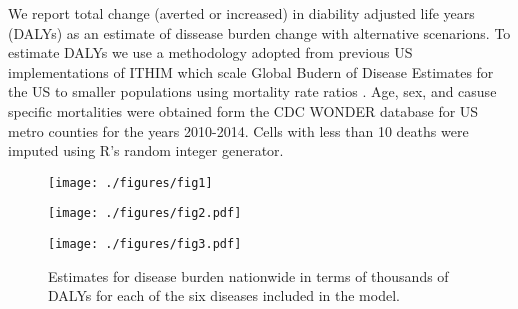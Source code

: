 We report total change (averted or increased) in diability adjusted
life years (DALYs) as an estimate of dissease burden change with
alternative scenarions. To estimate DALYs we use a methodology adopted
from previous US implementations of ITHIM which scale Global Budern of
Disease Estimates for the US to smaller populations using mortality
rate ratios \cite{maizlish2013}. Age, sex, and casuse specific
mortalities were obtained form the CDC WONDER database for US metro
counties for the years 2010-2014. Cells with less than 10 deaths were
imputed using R's random integer generator.

\begin{figure}[t]
  \centerline{\texttt{[image: ./figures/fig1]}}
    \caption{}\label{fig1}
\end{figure}

\begin{figure}[t]
  \centerline{\texttt{[image: ./figures/fig2.pdf]}}
    \caption{}\label{fig2}
\end{figure}

\begin{figure}[t]
  \centerline{\texttt{[image: ./figures/fig3.pdf]}}
  \caption{Estimates for disease burden nationwide in terms of thousands of
    DALYs for each of the six diseases included in the model.
  }\label{fig3}
\end{figure}
